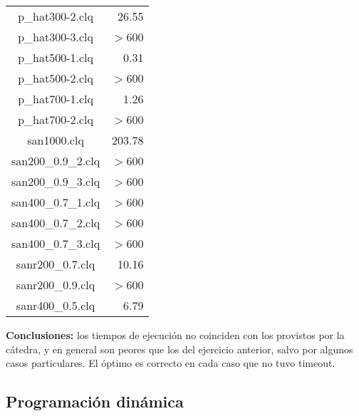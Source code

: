 \documentclass[10pt, a4paper]{article}
\begin{document}
\begin{center}
\begin{tabular}{ c r }
p\_hat300-2.clq & 26.55 \\
p\_hat300-3.clq & $>$600 \\
p\_hat500-1.clq & 0.31 \\
p\_hat500-2.clq & $>$600 \\
p\_hat700-1.clq & 1.26 \\
p\_hat700-2.clq & $>$600 \\
san1000.clq & 203.78 \\
san200\_0.9\_2.clq & $>$600 \\
san200\_0.9\_3.clq & $>$600 \\
san400\_0.7\_1.clq & $>$600 \\
san400\_0.7\_2.clq & $>$600 \\
san400\_0.7\_3.clq & $>$600 \\
sanr200\_0.7.clq & 10.16 \\
sanr200\_0.9.clq & $>$600 \\
sanr400\_0.5.clq & 6.79 \\
\end{tabular}
\end{center}

\textbf{Conclusiones:} los tiempos de ejecución no coinciden con los provistos por la cátedra, y en general son peores que los del ejercicio anterior, salvo por algunos casos particulares. El óptimo es correcto en cada caso que no tuvo timeout.

\subsection{Programación dinámica}
\end{document}
